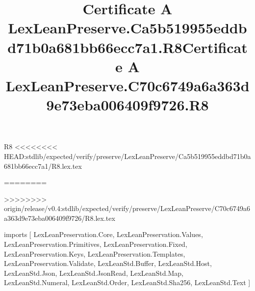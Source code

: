 \begin{lexlean}{R8}
<<<<<<<< HEAD:stdlib/expected/verify/preserve/LexLeanPreserve/Ca5b519955eddbd71b0a681bb66ecc7a1/R8.lex.tex
\title{Certificate A LexLeanPreserve.Ca5b519955eddbd71b0a681bb66ecc7a1.R8}
========
\title{Certificate A LexLeanPreserve.C70c6749a6a363d9e73eba006409f9726.R8}
>>>>>>>> origin/release/v0.4:stdlib/expected/verify/preserve/LexLeanPreserve/C70c6749a6a363d9e73eba006409f9726/R8.lex.tex
\begin{coremodule}
imports [
  LexLeanPreservation.Core,
  LexLeanPreservation.Values,
  LexLeanPreservation.Primitives,
  LexLeanPreservation.Fixed,
  LexLeanPreservation.Keys,
  LexLeanPreservation.Templates,
  LexLeanPreservation.Validate,
  LexLeanStd.Buffer,
  LexLeanStd.Host,
  LexLeanStd.Json,
  LexLeanStd.JsonRead,
  LexLeanStd.Map,
  LexLeanStd.Numeral,
  LexLeanStd.Order,
  LexLeanStd.Sha256,
  LexLeanStd.Text
]


\end{coremodule}
\end{lexlean}
